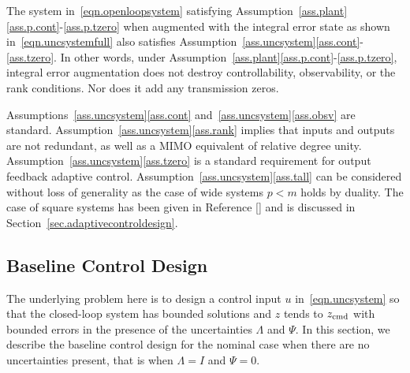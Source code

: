 \documentclass[]{../sty/aiaa-tc}
\begin{document}
  \begin{rem-dan}
    The system in\ \eqref{eqn.openloopsystem} satisfying Assumption~\ref{ass.plant}\ref{ass.p.cont}-\ref{ass.p.tzero} when augmented with the integral error state as shown in\ \eqref{eqn.uncsystemfull} also satisfies Assumption~\ref{ass.uncsystem}\ref{ass.cont}-\ref{ass.tzero}.
    In other words, under Assumption~\ref{ass.plant}\ref{ass.p.cont}-\ref{ass.p.tzero}, integral error augmentation does not destroy controllability, observability, or the rank conditions.
    Nor does it add any transmission zeros\cite{lavretsky.output.2010}.
  \end{rem-dan}

  \begin{rem-dan}
    Assumptions~\ref{ass.uncsystem}\ref{ass.cont} and~\ref{ass.uncsystem}\ref{ass.obsv} are standard.
    Assumption~\ref{ass.uncsystem}\ref{ass.rank} implies that inputs and outputs are not redundant, as well as a MIMO equivalent of relative degree unity.
    Assumption~\ref{ass.uncsystem}\ref{ass.tzero} is a standard requirement for output feedback adaptive control.
    Assumption~\ref{ass.uncsystem}\ref{ass.tall} can be considered without loss of generality as the case of wide systems $p<m$ holds by duality.
    The case of square systems has been given in Reference [] and is discussed in Section~\ref{sec.adaptivecontroldesign}.
  \end{rem-dan}

  \subsection{Baseline Control Design}

  The underlying problem here is to design a control input $u$ in\ \eqref{eqn.uncsystem} so that the closed-loop system has bounded solutions and $z$ tends to  $z_{{\rm cmd}}$ with bounded errors in the presence of the uncertainties $\Lambda$ and $\Psi$.
  In this section, we describe the baseline control design for the nominal case when there are no uncertainties present, that is when $\Lambda=I$ and $\Psi=0$.
\end{document}
